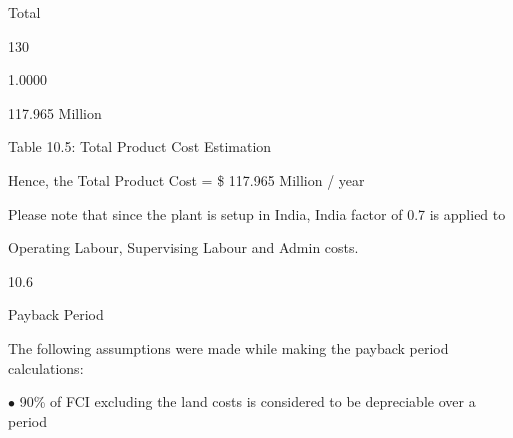 \documentclass[a4paper,portrait,12pt]{article}
\begin{document}
\begin{flushleft}
Total
\end{flushleft}





130





1.0000





\begin{flushleft}
117.965 Million
\end{flushleft}





\begin{flushleft}
Table 10.5: Total Product Cost Estimation
\end{flushleft}





\begin{flushleft}
Hence, the Total Product Cost = \$ 117.965 Million / year
\end{flushleft}


\begin{flushleft}
Please note that since the plant is setup in India, India factor of 0.7 is applied to
\end{flushleft}


\begin{flushleft}
Operating Labour, Supervising Labour and Admin costs.
\end{flushleft}





10.6





\begin{flushleft}
Payback Period
\end{flushleft}





\begin{flushleft}
The following assumptions were made while making the payback period calculations:
\end{flushleft}





\begin{flushleft}
$\bullet$ 90\% of FCI excluding the land costs is considered to be depreciable over a period
\end{flushleft}
\end{document}
